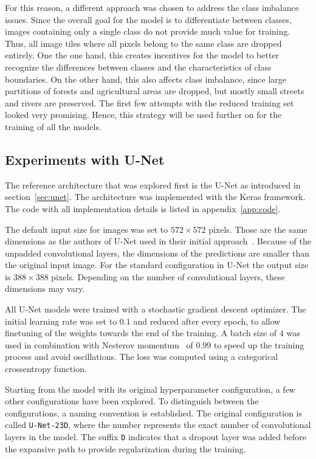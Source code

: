 For this reason, a different approach was chosen to address the class imbalance issues. Since the overall goal for the model is to differentiate between classes, images containing only a single class do not provide much value for training. Thus, all image tiles where all pixels belong to the same class are dropped entirely. One the one hand, this creates incentives for the model to better recognize the differences between classes and the characteristics of class boundaries. On the other hand, this also affects class imbalance, since large partitions of forests and agricultural areas are dropped, but mostly small streets and rivers are preserved. The first few attempts with the reduced training set looked    very promising. Hence, this strategy will be used further on for the training of all the models.


\subsection{Experiments with U-Net}
The reference architecture that was explored first is the U-Net as introduced in section~\ref{sec:unet}. The architecture was implemented with the Keras framework. The code with all implementation details is listed in appendix~\ref{app:code}.

The default input size for images was set to $572\times 572$ pixels. Those are the same dimensions as the authors of U-Net used in their initial approach~\cite{unet15}. Because of the unpadded convolutional layers, the dimensions of the predictions are smaller than the original input image. For the standard configuration in U-Net the output size is $388\times 388$ pixels. Depending on the number of convolutional layers, these dimensions may vary.

All U-Net models were trained with a stochastic gradient descent optimizer. The initial learning rate was set to $0.1$ and reduced after every epoch, to allow finetuning of the weights towards the end of the training. A batch size of $4$ was used in combination with Nesterov momentum~\cite{nesterov83} of $0.99$ to speed up the training process and avoid oscillations. The loss was computed using a categorical crossentropy function.

Starting from the model with its original hyperparameter configuration, a few other configurations have been explored. To distinguish between the configurations, a naming convention is established. The original configuration is called \texttt{U-Net-23D}, where the number represents the exact number of convolutional layers in the model. The suffix \texttt{D} indicates that a dropout layer was added before the expansive path to provide regularization during the training.

